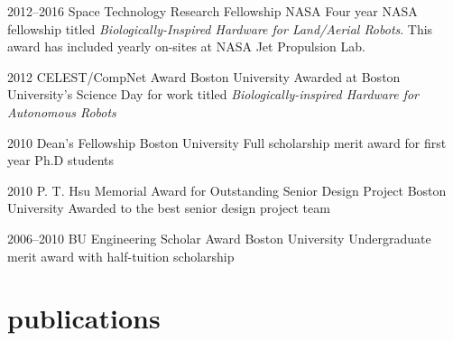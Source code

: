\documentclass[]{friggeri-cv} %
\begin{document}
\begin{entrylist}


\entry
{2012--2016}
{Space Technology Research Fellowship}
{NASA}
{Four year NASA fellowship titled \emph{Biologically-Inspired Hardware for Land/Aerial Robots}. This award has included yearly on-sites at NASA Jet Propulsion Lab.}

\entry
{2012}
{CELEST/CompNet Award}
{Boston University}
{Awarded at Boston University's Science Day for work titled \emph{Biologically-inspired Hardware for Autonomous Robots}}

\entry
{2010}
{Dean's Fellowship}
{Boston University}
{Full scholarship merit award for first year Ph.D students}

\entry
{2010}
{P. T. Hsu Memorial Award for Outstanding Senior Design Project}
{Boston University}
{Awarded to the best senior design project team}

\entry
{2006--2010}
{BU Engineering Scholar Award}
{Boston University}
{Undergraduate merit award with half-tuition scholarship}


\end{entrylist}





\section{publications}





\end{document}
